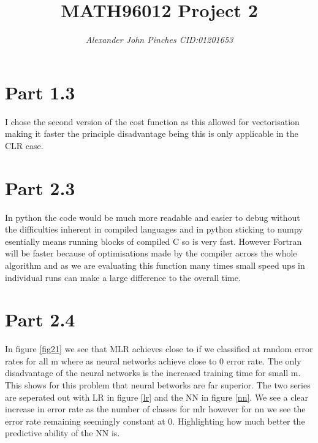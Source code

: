 \documentclass{article}
\title{MATH96012 Project 2}
\author{\emph{Alexander John Pinches CID:01201653}}
\begin{document}
\maketitle


\section*{Part 1.3}
I chose the second version of the cost function as this allowed for vectorisation making it faster the principle disadvantage being this is only applicable in the CLR case.



\section*{Part 2.3}
In python the code would be much more readable and easier to debug without the difficulties inherent in compiled languages and in python sticking to numpy esentially means running blocks of compiled C so is very fast. 
However Fortran will be faster because of optimisations made by the compiler across the whole algorithm and as we are evaluating this function many times small speed ups in individual runs can make a large difference to the overall time.




\section*{Part 2.4}
In figure \ref{fig21} we see that MLR achieves close to if we classified at random error rates for all m where as neural networks achieve close to 0 error rate. The only disadvantage of the neural networks is the increased training time for small m. This shows for this problem that neural betworks are far superior. The two series are seperated out with LR in figure \ref{lr} and the NN in figure \ref{nn}. We see a clear increase in error rate as the number of classes for mlr however for nn we see the error rate remaining seemingly constant at 0. Highlighting how much better the predictive ability of the NN is. 
\end{document}
